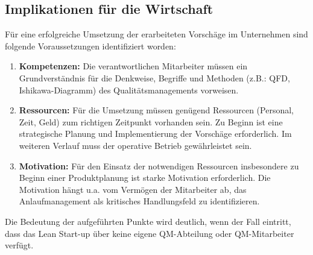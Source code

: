 \subsection*{Implikationen für die Wirtschaft}

Für eine erfolgreiche Umsetzung der erarbeiteten Vorschäge im Unternehmen sind folgende Voraussetzungen identifiziert worden: 
\begin{enumerate}
 \item \textbf{Kompetenzen: } Die verantwortlichen Mitarbeiter müssen ein Grundverständnis für die Denkweise, Begriffe und Methoden (z.B.: QFD, Ishikawa-Diagramm) des Qualitätsmanagements vorweisen. 
 \item \textbf{Ressourcen: } Für die Umsetzung müssen genügend Ressourcen (Personal, Zeit, Geld) zum richtigen Zeitpunkt vorhanden sein. Zu Beginn ist eine strategische Planung und Implementierung der Vorschäge erforderlich. Im weiteren Verlauf muss der operative Betrieb gewährleistet sein. 
 \item \textbf{Motivation: } Für den Einsatz der notwendigen Ressourcen insbesondere zu Beginn einer Produktplanung ist starke Motivation erforderlich. Die Motivation hängt u.a. vom Vermögen der Mitarbeiter ab, das Anlaufmanagement als kritisches Handlungsfeld zu identifizieren. 
\end{enumerate}

Die Bedeutung der aufgeführten Punkte wird deutlich, wenn der Fall eintritt, dass das Lean Start-up über keine eigene QM-Abteilung oder QM-Mitarbeiter verfügt. 